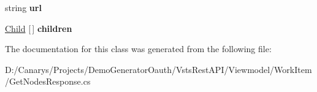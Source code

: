\begin{DoxyCompactItemize}
\mbox{\label{class_vsts_rest_a_p_i_1_1_viewmodel_1_1_work_item_1_1_get_nodes_response_1_1_child_a9c70dc5c0ca6c7827d24a3a36650399a}} 
string {\bfseries url}
\item 
\mbox{\label{class_vsts_rest_a_p_i_1_1_viewmodel_1_1_work_item_1_1_get_nodes_response_1_1_child_aab5a0a0693a289ed7d1976db710cd25b}} 
\mbox{\hyperlink{class_vsts_rest_a_p_i_1_1_viewmodel_1_1_work_item_1_1_get_nodes_response_1_1_child}{Child}} \mbox{[}$\,$\mbox{]} {\bfseries children}
\end{DoxyCompactItemize}


The documentation for this class was generated from the following file\+:\begin{DoxyCompactItemize}
\item 
D\+:/\+Canarys/\+Projects/\+Demo\+Generator\+Oauth/\+Vsts\+Rest\+A\+P\+I/\+Viewmodel/\+Work\+Item/Get\+Nodes\+Response.\+cs\end{DoxyCompactItemize}
